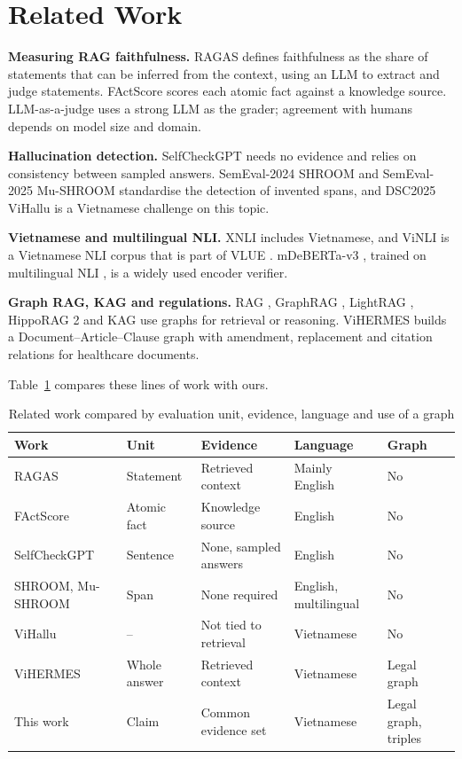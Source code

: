 \documentclass[conference]{IEEEtran}
\begin{document}
\section{Related Work}
\textbf{Measuring RAG faithfulness.} RAGAS \cite{ragas} defines faithfulness as the share of statements that can be inferred from the context, using an LLM to extract and judge statements. FActScore \cite{factscore} scores each atomic fact against a knowledge source. LLM-as-a-judge \cite{judge} uses a strong LLM as the grader; agreement with humans depends on model size and domain.

\textbf{Hallucination detection.} SelfCheckGPT \cite{selfcheck} needs no evidence and relies on consistency between sampled answers. SemEval-2024 SHROOM \cite{shroom} and SemEval-2025 Mu-SHROOM \cite{mushroom} standardise the detection of invented spans, and DSC2025 ViHallu \cite{vihallu} is a Vietnamese challenge on this topic.

\textbf{Vietnamese and multilingual NLI.} XNLI \cite{xnli} includes Vietnamese, and ViNLI \cite{vinli} is a Vietnamese NLI corpus that is part of VLUE \cite{vlue}. mDeBERTa-v3 \cite{deberta}, trained on multilingual NLI \cite{mdeberta}, is a widely used encoder verifier.

\textbf{Graph RAG, KAG and regulations.} RAG \cite{rag}, GraphRAG \cite{graphrag}, LightRAG \cite{lightrag}, HippoRAG 2 \cite{hipporag} and KAG \cite{kag} use graphs for retrieval or reasoning. ViHERMES \cite{vihermes} builds a Document--Article--Clause graph with amendment, replacement and citation relations for healthcare documents.

Table~\ref{tab:related} compares these lines of work with ours.

\begin{table}[t]
\caption{Related work compared by evaluation unit, evidence, language and use of a graph}
\label{tab:related}
\centering
\footnotesize
\begin{tabular}{lllll}
\toprule
Work & Unit & Evidence & Language & Graph \\
\midrule
RAGAS \cite{ragas} & Statement & Retrieved context & Mainly English & No \\
FActScore \cite{factscore} & Atomic fact & Knowledge source & English & No \\
SelfCheckGPT \cite{selfcheck} & Sentence & None, sampled answers & English & No \\
SHROOM, Mu-SHROOM \cite{shroom,mushroom} & Span & None required & English, multilingual & No \\
ViHallu \cite{vihallu} & -- & Not tied to retrieval & Vietnamese & No \\
ViHERMES \cite{vihermes} & Whole answer & Retrieved context & Vietnamese & Legal graph \\
This work & Claim & Common evidence set & Vietnamese & Legal graph, triples \\
\bottomrule
\end{tabular}
\end{table}
\end{document}

